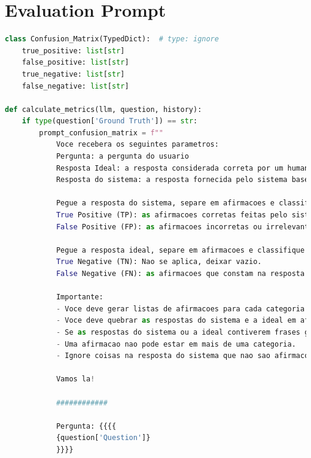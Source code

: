     \section{Evaluation Prompt}

\begin{lstlisting}[style=mystyle, language=Python, caption={C\'{o}digo para LLM-as-a-Judge}, label={code:llm-judge}]
class Confusion_Matrix(TypedDict):  # type: ignore
    true_positive: list[str]
    false_positive: list[str]
    true_negative: list[str]
    false_negative: list[str]

def calculate_metrics(llm, question, history):
    if type(question['Ground Truth']) == str:
        prompt_confusion_matrix = f""                
            Voce recebera os seguintes parametros:
            Pergunta: a pergunta do usuario
            Resposta Ideal: a resposta considerada correta por um humano
            Resposta do sistema: a resposta fornecida pelo sistema baseado em IA

            Pegue a resposta do sistema, separe em afirmacoes e classifique cada afirmacao entre as opcoes abaixo:
            True Positive (TP): as afirmacoes corretas feitas pelo sistema, ou seja, que estao presentes na resposta ideal.
            False Positive (FP): as afirmacoes incorretas ou irrelevantes feitas pelo sistema, ou seja, que nao estao presentes na resposta ideal.

            Pegue a resposta ideal, separe em afirmacoes e classifique cada afirmacao entre as opcoes abaixo:
            True Negative (TN): Nao se aplica, deixar vazio.
            False Negative (FN): as afirmacoes que constam na resposta ideal, mas nao foram feitas pelo sistema.

            Importante:
            - Voce deve gerar listas de afirmacoes para cada categoria. 
            - Voce deve quebrar as respostas do sistema e a ideal em afirmacoes objetivas.
            - Se as respostas do sistema ou a ideal contiverem frases grandes com mtas afirmacoes, analisar cada afirmacao separadamente.
            - Uma afirmacao nao pode estar em mais de uma categoria.
            - Ignore coisas na resposta do sistema que nao sao afirmacoes objetivas, como por exemplo citacoes de fontes e links.

            Vamos la!

            ############

            Pergunta: {{{{
            {question['Question']}
            }}}}


\end{lstlisting}
